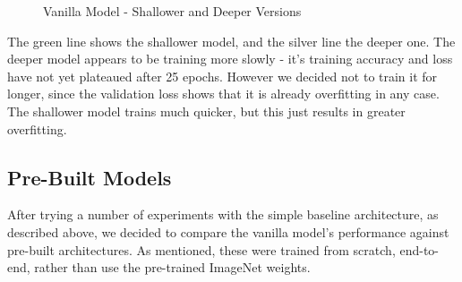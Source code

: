\documentclass[11pt]{article} %
\theoremstyle{plain}
\theoremstyle{definition}
\begin{document}
\begin{figure}[!ht]
\centering
{}
\newline
{}
\caption{Vanilla Model - Shallower and Deeper Versions}
\label{fig:vanilla_medium}
\end{figure}
\FloatBarrier
\noindent
The green line shows the shallower model, and the silver line the deeper one. The deeper model appears to be training more slowly - it's training accuracy and loss have not yet plateaued after 25 epochs. However we decided not to train it for longer, since the validation loss shows that it is already overfitting in any case. The shallower model trains much quicker, but this just results in greater overfitting.

\subsection{Pre-Built Models}
After trying a number of experiments with the simple baseline architecture, as described above, we decided to compare the vanilla model's performance against pre-built architectures. As mentioned, these were trained from scratch, end-to-end, rather than use the pre-trained ImageNet weights. 
\end{document}
